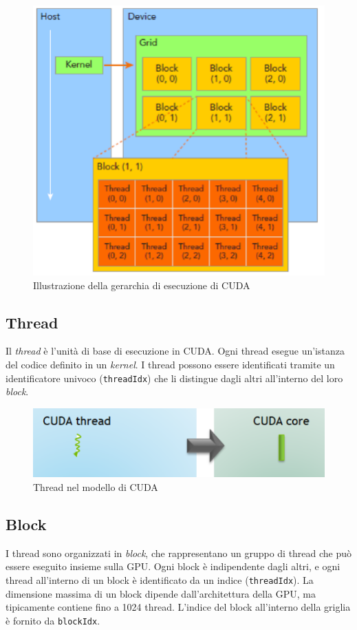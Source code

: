 \documentclass[12pt,a4paper]{report}
\begin{document}
\begin{figure}[h]
    \centering
    \includegraphics[width=0.7\linewidth]{img/hierarchy.png}
    \caption{Illustrazione della gerarchia di esecuzione di CUDA \cite{CUDAhierarchy}}
\end{figure}

\subsection*{Thread}
Il \textit{thread} è l'unità di base di esecuzione in CUDA. Ogni thread esegue un'istanza del codice definito in un \textit{kernel}. I thread possono essere identificati tramite un identificatore univoco (\texttt{threadIdx}) che li distingue dagli altri all'interno del loro \textit{block}.

\begin{figure}[h]
    \centering
    \includegraphics[width=0.7\linewidth]{img/cuda_thread.png}
    \caption{Thread nel modello di CUDA \cite{CUDA_blog}}
\end{figure}

\subsection*{Block}
I thread sono organizzati in \textit{block}, che rappresentano un gruppo di thread che può essere eseguito insieme sulla GPU. Ogni block è indipendente dagli altri, e ogni thread all'interno di un block è identificato da un indice (\texttt{threadIdx}). La dimensione massima di un block dipende dall'architettura della GPU, ma tipicamente contiene fino a 1024 thread. L'indice del block all'interno della griglia è fornito da \texttt{blockIdx}.
\end{document}
